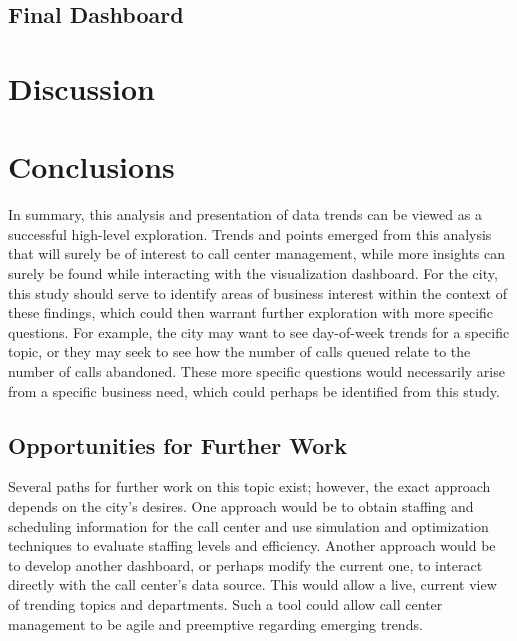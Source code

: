 \documentclass[11pt,twocolumn]{article}
\begin{document}
	\subsection{Final Dashboard}



\section{Discussion}


\section{Conclusions}

In summary, this analysis and presentation of data trends can be viewed as a successful high-level exploration.  Trends and points emerged from this analysis that will surely be of interest to call center management, while more insights can surely be found while interacting with the visualization dashboard.  For the city, this study should serve to identify areas of business interest within the context of these findings, which could then warrant further exploration with more specific questions.  For example, the city may want to see day-of-week trends for a specific topic, or they may seek to see how the number of calls queued relate to the number of calls abandoned.  These more specific questions would necessarily arise from a specific business need, which could perhaps be identified from this study.

	\subsection{Opportunities for Further Work}

Several paths for further work on this topic exist; however, the exact approach depends on the city's desires.  One approach would be to obtain staffing and scheduling information for the call center and use simulation and optimization techniques to evaluate staffing levels and efficiency.  Another approach would be to develop another dashboard, or perhaps modify the current one, to interact directly with the call center's data source.  This would allow a live, current view of trending topics and departments.  Such a tool could allow call center management to be agile and preemptive regarding emerging trends.



\begin{thebibliography}{6}
	
\bibitem{}


\end{thebibliography}


\end{document}
